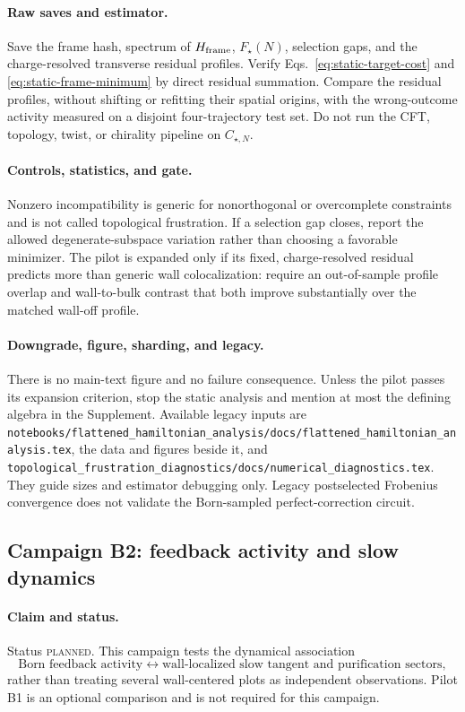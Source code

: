 \documentclass[aps,prx,onecolumn,nofootinbib,superscriptaddress,longbibliography]{revtex4-2}
\newcommand{\code}[1]{\texttt{#1}}
\newcommand{\planned}{\textsc{planned}}
\begin{document}
\paragraph{Raw saves and estimator.}
Save the frame hash, spectrum of $H_{\rm frame}$, $F_\star(N)$, selection gaps, and the
charge-resolved transverse residual profiles.  Verify
Eqs.~\eqref{eq:static-target-cost} and \eqref{eq:static-frame-minimum} by direct residual
summation.  Compare the residual profiles, without shifting or refitting their spatial
origins, with the wrong-outcome activity measured on a disjoint four-trajectory test set.
Do not run the CFT, topology, twist, or chirality pipeline on $C_{\star,N}$.

\paragraph{Controls, statistics, and gate.}
Nonzero incompatibility is generic for nonorthogonal or overcomplete constraints and is not
called topological frustration.  If a selection gap closes, report the allowed
degenerate-subspace variation rather than choosing a favorable minimizer.  The pilot is
expanded only if its fixed, charge-resolved residual predicts more than generic wall
colocalization: require an out-of-sample profile overlap and wall-to-bulk contrast that
both improve substantially over the matched wall-off profile.

\paragraph{Downgrade, figure, sharding, and legacy.}
There is no main-text figure and no failure consequence.  Unless the pilot passes its
expansion criterion, stop the static analysis and mention at most the defining algebra in
the Supplement.  Available legacy inputs are
\code{notebooks/flattened\_hamiltonian\_analysis/docs/flattened\_hamiltonian\_analysis.tex},
the data and figures beside it, and
\code{topological\_frustration\_diagnostics/docs/numerical\_diagnostics.tex}.
They guide sizes and estimator debugging only.  Legacy postselected Frobenius convergence
does not validate the Born-sampled perfect-correction circuit.

\subsection{Campaign B2: feedback activity and slow dynamics}
\paragraph{Claim and status.}
Status \planned.  This campaign tests the dynamical association
\begin{equation}
 \text{Born feedback activity}
 \longleftrightarrow
 \text{wall-localized slow tangent and purification sectors},
 \label{eq:mechanism-chain}
\end{equation}
rather than treating several wall-centered plots as independent observations.  Pilot B1
is an optional comparison and is not required for this campaign.
\end{document}
